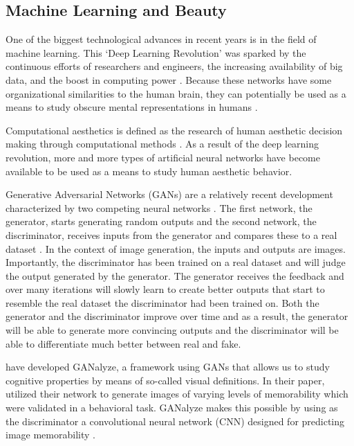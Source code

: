 \documentclass[../main.tex]{subfiles}
\begin{document}
\subsection{Machine Learning and Beauty}
One of the biggest technological advances in recent years is in the field of machine learning. This `Deep Learning Revolution' was sparked by the continuous efforts of researchers and engineers, the increasing availability of big data, and the boost in computing power \parencite{sejnowskiDeepLearningRevolution2018}. Because these networks have some organizational similarities to the human brain, they can potentially be used as a means to study obscure mental representations in humans \parencite{guoDeepLearningVisual2016, goetschalckx2021generative}. 

Computational aesthetics is defined as the research of human aesthetic decision making through computational methods \parencite{valenziseAdvancesChallengesComputational2022, hoenig2005proceedings}. As a result of the deep learning revolution, more and more types of artificial neural networks have become available to be used as a means to study human aesthetic behavior.

Generative Adversarial Networks (GANs) are a relatively recent development characterized by two competing neural networks \parencite{goodfellow2014generative}. The first network, the generator, starts generating random outputs and the second network, the discriminator, receives inputs from the generator and compares these to a real dataset \parencite{creswellGenerativeAdversarialNetworks2018}. In the context of image generation, the inputs and outputs are images. Importantly, the discriminator has been trained on a real dataset and will judge the output generated by the generator. The generator receives the feedback and over many iterations will slowly learn to create better outputs that start to resemble the real dataset the discriminator had been trained on. Both the generator and the discriminator improve over time and as a result, the generator will be able to generate more convincing outputs and the discriminator will be able to differentiate much better between real and fake.


\textcite{goetschalckxGANalyzeVisualDefinitions2019} have developed GANalyze, a framework using GANs that allows us to study cognitive properties by means of so-called visual definitions. In their paper, \textcite{goetschalckxGANalyzeVisualDefinitions2019} utilized their network to generate images of varying levels of memorability which were validated in a behavioral task. GANalyze makes this possible by using as the discriminator a convolutional neural network (CNN) designed for predicting image memorability \parencite{khosla2015understanding}.
\end{document}
